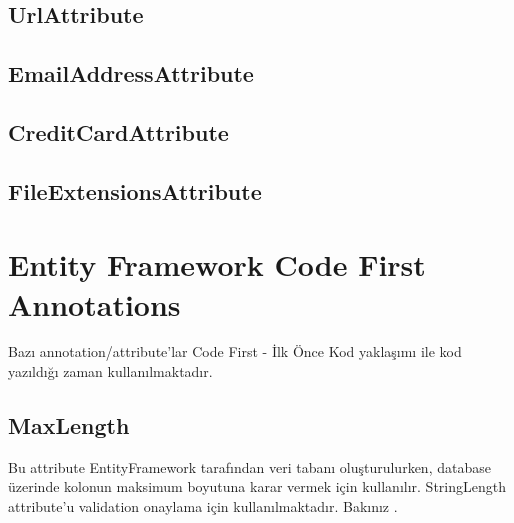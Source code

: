 \documentclass[10pt,a4paper]{article}
\begin{document}
\subsection{UrlAttribute}
\subsection{EmailAddressAttribute}
\subsection{CreditCardAttribute}
\subsection{FileExtensionsAttribute}






\section{Entity Framework Code First Annotations}

Bazı annotation/attribute'lar Code First - İlk Önce Kod yaklaşımı ile
kod yazıldığı zaman kullanılmaktadır.

\subsection{MaxLength}
Bu attribute EntityFramework tarafından veri tabanı oluşturulurken,
database üzerinde kolonun maksimum boyutuna karar vermek için kullanılır.
StringLength attribute'u validation onaylama için kullanılmaktadır.
Bakınız \cite{StackOverflow2011StringLength}.








% 

\end{document}
